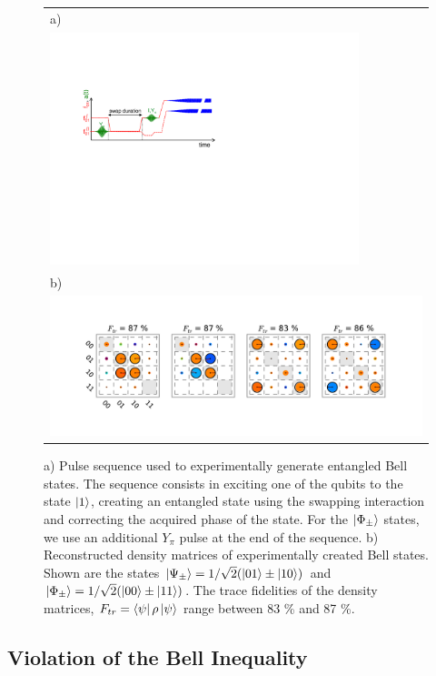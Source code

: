 \begin{figure}[hb!]
  \flushright
	\begin{tabular}{l}
	a) \\
	\includegraphics[width=9cm]{"./material/figures/measurement/bell_state_creation"} \\
	b) \\
	\includegraphics[width=1\textwidth]{"./data/ct5/2011_02_09 preparation of bell states/bell matrices"}
	\end{tabular}
	\caption{a) Pulse sequence used to experimentally generate entangled Bell states. The sequence consists in exciting one of the qubits to the state $\left| 1 \right>$, creating an entangled state using the swapping interaction and correcting the acquired phase of the state. For the $\left| \Phi_\pm \right>$ states, we use an additional $Y_\pi$ pulse at the end of the sequence. b) Reconstructed density matrices of experimentally created Bell states. Shown are the states $\left| \Psi_\pm \right>=1/\sqrt{2}(\left| 01 \right>\pm\left| 10 \right>)$ and $\left| \Phi_\pm \right>=1/\sqrt{2}(\left| 00 \right>\pm\left| 11 \right>)$. The trace fidelities of the density matrices, $F_{tr}=\left< \psi \right|\rho\left| \psi \right>$ range between 83 \% and 87 \%.}
	\label{fig:bell_generation_pulse_sequence}
	\label{fig:bell_states}
\end{figure}

\subsection{Violation of the Bell Inequality}

